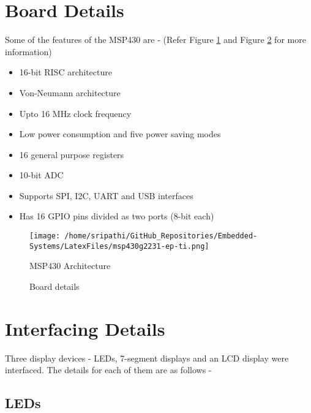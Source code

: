 \documentclass[12pt, letterpaper]{article}
\begin{document}
\section{Board Details}

Some of the features of the MSP430 are - (Refer Figure \ref{fig:architecture} and Figure \ref{fig:board} for more information)

\begin{itemize}
	\item 16-bit RISC architecture
	\item Von-Neumann architecture
	\item Upto 16 MHz clock frequency
	\item Low power consumption and five power saving modes
	\item 16 general purpose registers
	\item 10-bit ADC
	\item Supports SPI, I2C, UART and USB interfaces
	\item Has 16 GPIO pins divided as two ports (8-bit each)
\end{itemize}
	
\begin{figure}[t]
	\centering
	\texttt{[image: /home/sripathi/GitHub\_Repositories/Embedded-Systems/LatexFiles/msp430g2231-ep-ti.png]}
	\caption{MSP430 Architecture}
	\label{fig:architecture}
\end{figure}

\begin{figure}[t]
	\centering
		\caption{Board details}
		\label{fig:board}
\end{figure}

\section{Interfacing Details}

Three display devices - LEDs, 7-segment displays and an LCD display were interfaced. The details for each of them are as follows - 

\subsection{LEDs}
\end{document}
